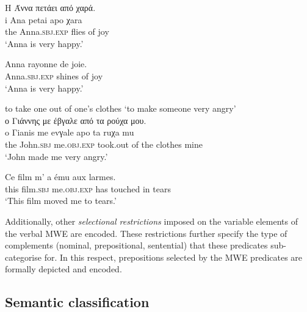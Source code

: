 \documentclass[output=paper]{langsci/langscibook}
\begin{document}
\begin{exe}
\ex \label{ex:3:35}
\glll  H Άννα πετάει από χαρά. \\
i Ana petai apo χara\\
 the  Anna.\textsc{sbj.exp} flies of joy\\
\glt  %
‘Anna is very happy.’
\end{exe}

\begin{exe}
\ex \label{ex:3:36}
\gll Anna rayonne de joie. \\
Anna.\textsc{sbj.exp} shines of joy\\
\glt ‘Anna is very happy.’
\end{exe}

\begin{exe}
\ex \label{ex:3:37}
to take one out of one's clothes `to make someone very angry'\\
\glll ο Γιάννης με έβγαλε από τα ρούχα μου. \\
o Γianis me evγale apo ta ruχa mu\\
the John.\textsc{sbj} me.\textsc{obj.exp} took.out of the clothes mine\\
\glt  %
‘John made me very angry.’
\end{exe}

\begin{exe}
\ex \label{ex:3:38}
\gll Ce film m' a ému aux larmes. \\
this film.\textsc{sbj} me.\textsc{obj.exp} has touched in tears\\
\glt ‘This film moved me to tears.’
\end{exe}

Additionally, other \textit{selectional restrictions} imposed
on the variable elements of the verbal MWE are encoded. These
restrictions further specify the type of complements (nominal,
prepositional, sentential) that these predicates sub-categorise for. In
this respect, prepositions selected by the MWE predicates are formally
depicted and encoded.





\subsection{Semantic classification}
\end{document}
